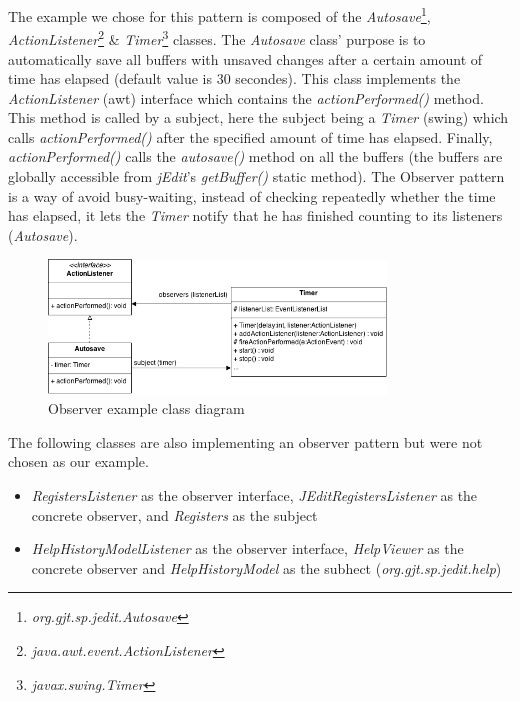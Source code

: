 The example we chose for this pattern is composed of the
\emph{Autosave}\footnote{\emph{org.gjt.sp.jedit.Autosave}},
\emph{ActionListener}\footnote{\emph{java.awt.event.ActionListener}} \&
\emph{Timer}\footnote{\emph{javax.swing.Timer}} classes. The
\emph{Autosave} class' purpose is to automatically save all buffers with
unsaved changes after a certain amount of time has elapsed (default
value is 30 secondes). This class implements the \emph{ActionListener}
(awt) interface which contains the \emph{actionPerformed()} method. This
method is called by a subject, here the subject being a \emph{Timer}
(swing) which calls \emph{actionPerformed()} after the specified amount
of time has elapsed. Finally, \emph{actionPerformed()} calls the
\emph{autosave()} method on all the buffers (the buffers are globally
accessible from \emph{jEdit}'s \emph{getBuffer()} static method). The
Observer pattern is a way of avoid busy-waiting, instead of checking
repeatedly whether the time has elapsed, it lets the \emph{Timer} notify
that he has finished counting to its listeners (\emph{Autosave}).

\begin{figure}[h!]
    \includegraphics[width=0.8\textwidth]{images/observer.png}
    \centering
    \caption{Observer example class diagram}
\end{figure}

\begin{framehint}
    The following classes are also implementing an observer pattern but were
    not chosen as our example.

    \begin{itemize}\itemsep1pt
        \item \emph{RegistersListener} as the observer interface,
        \emph{JEditRegistersListener} as the concrete observer, and
        \emph{Registers} as the subject

        \item \emph{HelpHistoryModelListener} as the observer interface,
          \emph{HelpViewer} as the concrete observer and \emph{HelpHistoryModel}
          as the subhect (\emph{org.gjt.sp.jedit.help})
    \end{itemize}
\end{framehint}
\newpage

